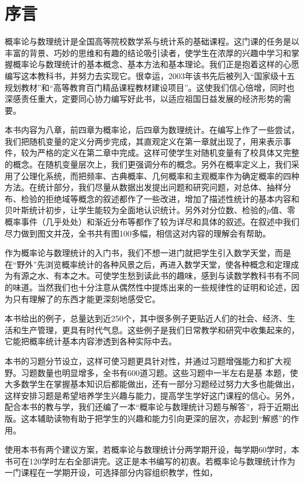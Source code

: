 
\chapter*{序\quad 言}
概率论与数理统计是全国高等院校数学系与统计系的基础课程。这门课的任务是以丰富的背景、巧妙的思维和有趣的结论吸引读者，使学生在浓厚的兴趣中学习和掌握概率论与数理统计的基本概念、基本方法和基本理论。我们正是抱着这样的心愿编写这本教科书，并努力去实现它。很幸运，2003年该书先后被列入“国家级十五规划教材”和“高等教育百门精品课程教材建设项目”。这使我们信心倍增，同时也深感责任重大，定要同心协力编写好此书，以适应祖国日益发展的经济形势的需要。

本书内容为八章，前四章为概率论，后四章为数理统计。在编写上作了一些尝试，我们把随机变量的定义分两步完成，其直观定义在第一章就出现了，用来表示事件，较为严格的定义在第二章中完成。这样可使学生对随机变量有了校具体又完整的概念。在随机变量层次上，我们更强调分布的概念。另外在概率定义上，我们采用了公理化系统，而把频率、古典概率、几何概率和主观概率作为确定概率的四种方法。在统计部分，我们尽量从数据出发提出问题和研究问题，对总体、抽样分布、检验的拒绝域等概念的叙述都作了一些改进，增加了描述性统计的基本内容和贝叶斯统计初步，让学生能较为全面地认识统计。另外对分位数、检验的$p$值、零概率事件（几乎处处）和渐近分布等都作了较为详尽和具体的叙述。在叙述中我们尽力做到图文并茂，全书共有图100多幅，相信这对内容的理解会有帮助。

作为概率论与数理统计的入门书，我们不想一进门就把学生引入数学天堂，而是在“野外”先浏览概率统计的各种风景之后，再进入数学天堂，使各种概念和定理成为有源之水、有本之木。可使学生愁到读此书的趣味，感到与读数学教科书有不同的味道。当然我们也十分注意从偶然性中提炼出来的一些规律性的证明和论述，因为只有理解了的东西才能更深刻地感受它。

本书给出的例子，总量达到近250个，其中很多例子更贴近人们的社会、经济、生活和生产管理，更具有时代气息。这些例子是我们日常教学和研究中收集起来的，它能把概率统计基本内容渗透到各种实际中去。

本书的习题分节设立，这样可使习题更具针对性，并通过习题增强能力和扩大视野。习题数量也明显增多，全书有600道习题。这些习题中一半左右是基
本题，使大多数学生在掌握基本知识后都能做出，还有一部分习题经过努力大多也能做出，这样安排习题是希望培养学生兴趣与能力，提高学生学好这门课程的信心。另外，配合本书的教与学，我们还编了一本“概率论与数理统计习题与解答”，将于近期出版。这本辅助读物有助于把学生的兴趣和能力引向更深的层次，亦起到“解惑”的作用。

使用本书有两个建议方案，若概率论与数理统计分两学期开设，每学期60学时，本书可在120学时左右全部讲完。这正是本书编写的初衷。若概率论与数理统计作为一门课程在一学期开设，可选择部分内容组织教学，性如，

